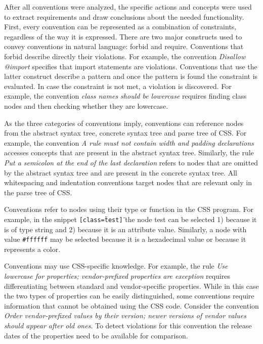 \documentclass[parskip=full]{uvamscse}
\begin{document}
After all conventions were analyzed, the specific actions and concepts were used to extract
requirements and draw conclusions about the needed functionality. First, every convention can be
represented as a combination of constraints, regardless of the way it is expressed. There are two
major constructs used to convey conventions in natural language: forbid and require. Conventions
that forbid describe directly their violations. For example, the convention \textit{Disallow
@import} specifies that import statements are violations. Conventions that use the latter construct
describe a pattern and once the pattern is found the constraint is evaluated. In case the constraint
is not met, a violation is discovered. For example, the convention \textit{class names should be
lowercase} requires finding class nodes and then checking whether they are lowercase.

As the three categories of conventions imply, conventions can reference nodes from the abstract
syntax tree, concrete syntax tree and parse tree of CSS. For example, the convention \textit{A rule
must not contain width and padding declarations} accesses concepts that are present in the abstract
syntax tree. Similarly, the rule \textit{Put a semicolon at the end of the last declaration} refers
to nodes that are omitted by the abstract syntax tree and are present in the concrete syntax tree.
All whitespacing and indentation conventions target nodes that are relevant only in the parse tree
of CSS.

Conventions refer to nodes using their type or function in the CSS program. For example, in the
snippet \texttt{[class=\"test\"]} the node test can be selected 1) because it is of type string and
2) because it is an attribute value. Similarly, a node with value \texttt{\#ffffff} may be selected
because it is a hexadecimal value or because it represents a color.

Conventions may use CSS-specific knowledge. For example, the rule \textit{Use lowercase for
properties; vendor-prefixed properties are exception} requires differentiating between standard and
vendor-specific properties. While in this case the two types of properties can be easily
distinguished, some conventions require information that cannot be obtained using the CSS code.
Consider the convention \textit{Order vendor-prefixed values by their version; newer versions of
vendor values should appear after old ones}. To detect violations for this convention the release
dates of the properties need to be available for comparison.
\end{document}
